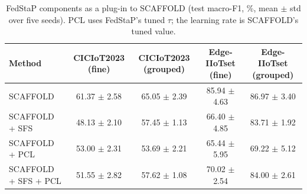 \begin{table}[t]
\centering
\caption{FedStaP components as a plug-in to SCAFFOLD (test macro-F1, \%, mean $\pm$ std over five seeds). PCL uses FedStaP's tuned $\tau$; the learning rate is SCAFFOLD's tuned value.}
\label{tab:plugin}
\small
\begin{tabular}{lcccc}
\toprule
Method & CICIoT2023 (fine) & CICIoT2023 (grouped) & Edge-IIoTset (fine) & Edge-IIoTset (grouped) \\
\midrule
SCAFFOLD & 61.37 $\pm$ 2.58 & 65.05 $\pm$ 2.39 & 85.94 $\pm$ 4.63 & 86.97 $\pm$ 3.40 \\
SCAFFOLD + SFS & 48.13 $\pm$ 2.10 & 57.45 $\pm$ 1.13 & 66.40 $\pm$ 4.85 & 83.71 $\pm$ 1.92 \\
SCAFFOLD + PCL & 53.00 $\pm$ 2.31 & 53.69 $\pm$ 2.21 & 65.44 $\pm$ 5.95 & 69.22 $\pm$ 5.12 \\
SCAFFOLD + SFS + PCL & 51.55 $\pm$ 2.82 & 57.62 $\pm$ 1.08 & 70.02 $\pm$ 2.54 & 84.00 $\pm$ 2.61 \\
\bottomrule
\end{tabular}
\end{table}
